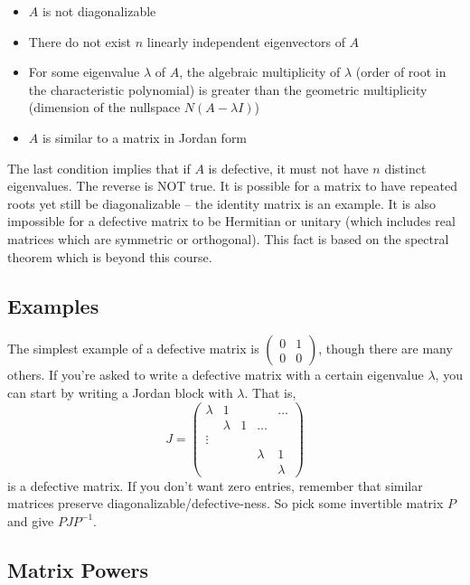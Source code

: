 \documentclass[11pt]{article}
\theoremstyle{plain} %
\theoremstyle{definition}
\theoremstyle{remark}
\begin{document}
\begin{itemize}
\item $A$ is not diagonalizable
\item There do not exist $n$ linearly independent eigenvectors of $A$
\item For some eigenvalue $\lambda$ of $A$, the algebraic multiplicity of $\lambda$ (order of root in the characteristic polynomial) is greater than the geometric multiplicity (dimension of the nullspace $N(A - \lambda I)$)
\item $A$ is similar to a matrix in Jordan form
\end{itemize}

The last condition implies that if $A$ is defective, it must not have $n$ distinct eigenvalues. The reverse is NOT true. It is possible for a matrix to have repeated roots yet still be diagonalizable -- the identity matrix is an example. It is also impossible for a defective matrix to be Hermitian or unitary (which includes real matrices which are symmetric or orthogonal). This fact is based on the spectral theorem which is beyond this course.

\subsection{Examples}
The simplest example of a defective matrix is $\begin{pmatrix}0 & 1\\0&0\end{pmatrix}$, though there are many others. If you're asked to write a defective matrix with a certain eigenvalue $\lambda$, you can start by writing a Jordan block with $\lambda$. That is, $$J = \begin{pmatrix}\lambda & 1 & & & \ldots\\& \lambda & 1 & \ldots &\\ \vdots & & &\\ & & & \lambda & 1 \\ & & & & \lambda \end{pmatrix}$$ is a defective matrix. If you don't want zero entries, remember that similar matrices preserve diagonalizable/defective-ness. So pick some invertible matrix $P$ and give $PJP^{-1}$.

\subsection{Matrix Powers}
\end{document}
